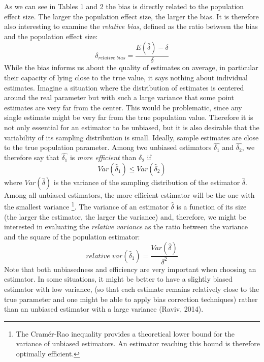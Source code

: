 \documentclass[
  english,
  man,floatsintext]{apa6}
\begin{document}
As we can see in Tables 1 and 2 the bias is directly related to the population effect size. The larger the population effect size, the larger the bias. It is therefore also interesting to examine the \emph{relative bias}, defined as the ratio between the bias and the population effect size:
\begin{equation} 
\delta_{relative \; bias}=\frac{E(\hat{\delta})-\delta}{\delta}
\label{eq:RELBIAS} 
\end{equation}
While the bias informs us about the quality of estimates on average, in particular their capacity of lying close to the true value, it says nothing about individual estimates. Imagine a situation where the distribution of estimates is centered around the real parameter but with such a large variance that some point estimates are very far from the center. This would be problematic, since any single estimate might be very far from the true population value. Therefore it is not only essential for an estimator to be unbiased, but it is also desirable that the variability of its sampling distribution is small. Ideally, sample estimates are close to the true population parameter. Among two unbiased estimators \(\hat{\delta_1}\) and \(\hat{\delta_2}\), we therefore say that \(\hat{\delta_1}\) is \emph{more efficient} than \(\hat{\delta_2}\) if
\begin{equation} 
Var(\hat{\delta}_1) \leq Var(\hat{\delta}_2)
\label{eq:EFFICIENCY} 
\end{equation}
where \(Var(\hat{\delta})\) is the variance of the sampling distribution of the estimator \(\hat{\delta}\). Among all unbiased estimators, the more efficient estimator will be the one with the smallest variance \footnote{The Cramér-Rao inequality provides a theoretical lower bound for the variance of unbiased estimators. An estimator reaching this bound is therefore optimally efficient.}. The variance of an estimator \(\hat{\delta}\) is a function of its size (the larger the estimator, the larger the variance) and, therefore, we might be interested in evaluating the \emph{relative variance} as the ratio between the variance and the square of the population estimator:
\begin{equation} 
relative \; var(\hat{\delta}_1)=\frac{Var(\hat{\delta})}{\delta^2}
\label{eq:RELVAR} 
\end{equation}
Note that both unbiasedness and efficiency are very important when choosing an estimator. In some situations, it might be better to have a slightly biased estimator with low variance, (so that each estimate remains relatively close to the true parameter and one might be able to apply bias correction techniques) rather than an unbiased estimator with a large variance (Raviv, 2014).
\end{document}
